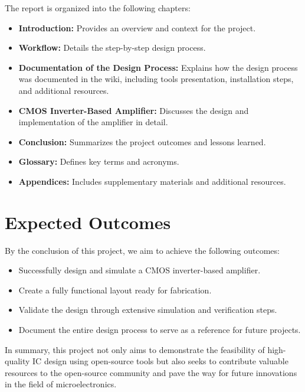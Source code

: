 The report is organized into the following chapters:
\begin{itemize}
    \item \textbf{Introduction:} Provides an overview and context for the project.
    \item \textbf{Workflow:} Details the step-by-step design process.
    \item \textbf{Documentation of the Design Process:} Explains how the design process was documented in the wiki, including tools presentation, installation steps, and additional resources.
    \item \textbf{CMOS Inverter-Based Amplifier:} Discusses the design and implementation of the amplifier in detail.
    \item \textbf{Conclusion:} Summarizes the project outcomes and lessons learned.
    \item \textbf{Glossary:} Defines key terms and acronyms.
    \item \textbf{Appendices:} Includes supplementary materials and additional resources.
\end{itemize}

\section{Expected Outcomes}

By the conclusion of this project, we aim to achieve the following outcomes:
\begin{itemize}
    \item Successfully design and simulate a CMOS inverter-based amplifier.
    \item Create a fully functional layout ready for fabrication.
    \item Validate the design through extensive simulation and verification steps.
    \item Document the entire design process to serve as a reference for future projects.
\end{itemize}

In summary, this project not only aims to demonstrate the feasibility of high-quality IC design using open-source tools but also seeks to contribute valuable resources to the open-source community and pave the way for future innovations in the field of microelectronics.

